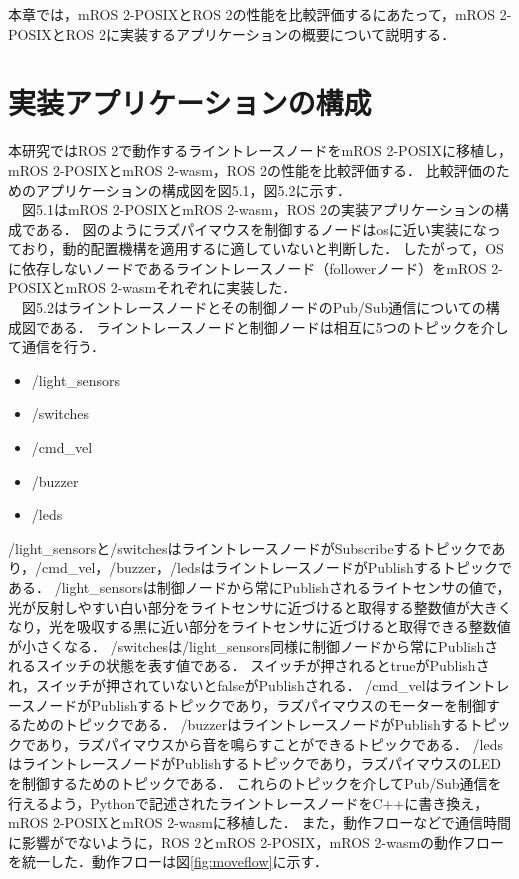 本章では，mROS 2-POSIXとROS 2の性能を比較評価するにあたって，mROS 2-POSIXとROS 2に実装するアプリケーションの概要について説明する．
\section{実装アプリケーションの構成}
本研究ではROS 2で動作するライントレースノードをmROS 2-POSIXに移植し，mROS 2-POSIXとmROS 2-wasm，ROS 2の性能を比較評価する．
比較評価のためのアプリケーションの構成図を図5.1，図5.2に示す．
\\　図5.1はmROS 2-POSIXとmROS 2-wasm，ROS 2の実装アプリケーションの構成である．
図のようにラズパイマウスを制御するノードはosに近い実装になっており，動的配置機構を適用するに適していないと判断した．
したがって，OSに依存しないノードであるライントレースノード（followerノード）をmROS 2-POSIXとmROS 2-wasmそれぞれに実装した．
\\　図5.2はライントレースノードとその制御ノードのPub/Sub通信についての構成図である．
ライントレースノードと制御ノードは相互に5つのトピックを介して通信を行う．
\begin{itemize}
    \item /light\_sensors
    \item /switches
    \item /cmd\_vel
    \item /buzzer
    \item /leds
\end{itemize}
/light\_sensorsと/switchesはライントレースノードがSubscribeするトピックであり，/cmd\_vel，/buzzer，/ledsはライントレースノードがPublishするトピックである．
/light\_sensorsは制御ノードから常にPublishされるライトセンサの値で，光が反射しやすい白い部分をライトセンサに近づけると取得する整数値が大きくなり，光を吸収する黒に近い部分をライトセンサに近づけると取得できる整数値が小さくなる．
/switchesは/light\_sensors同様に制御ノードから常にPublishされるスイッチの状態を表す値である．
スイッチが押されるとtrueがPublishされ，スイッチが押されていないとfalseがPublishされる．
/cmd\_velはライントレースノードがPublishするトピックであり，ラズパイマウスのモーターを制御するためのトピックである．
/buzzerはライントレースノードがPublishするトピックであり，ラズパイマウスから音を鳴らすことができるトピックである．
/ledsはライントレースノードがPublishするトピックであり，ラズパイマウスのLEDを制御するためのトピックである．
これらのトピックを介してPub/Sub通信を行えるよう，Pythonで記述されたライントレースノードをC++に書き換え，mROS 2-POSIXとmROS 2-wasmに移植した．
また，動作フローなどで通信時間に影響がでないように，ROS 2とmROS 2-POSIX，mROS 2-wasmの動作フローを統一した．動作フローは図\ref{fig:moveflow}に示す．

